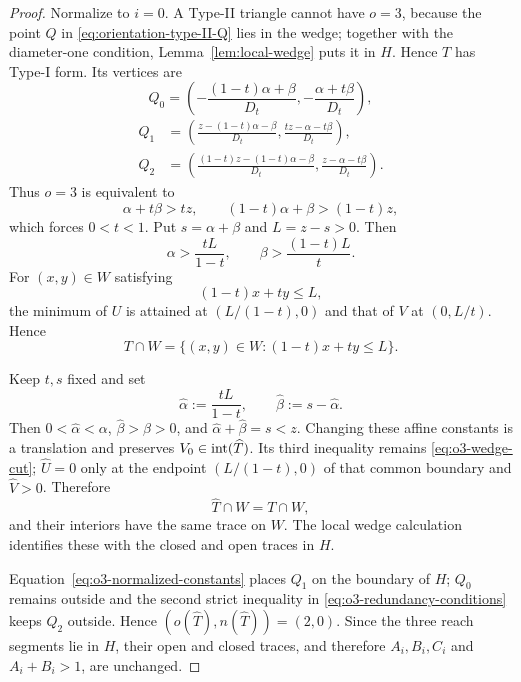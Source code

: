 \begin{proof}
Normalize to $i=0$.  A Type-II triangle cannot have $o=3$, because the point
$Q$ in \eqref{eq:orientation-type-II-Q} lies in the wedge; together with the
diameter-one condition, Lemma~\ref{lem:local-wedge} puts it in $H$.  Hence
$T$ has Type-I form.  Its vertices are
\[
 Q_0=\left(-\frac{(1-t)\alpha+\beta}{D_t},
           -\frac{\alpha+t\beta}{D_t}\right),
\]
\begin{equation}
\begin{aligned}
 Q_1&=\left(\frac{z-(1-t)\alpha-\beta}{D_t},
             \frac{tz-\alpha-t\beta}{D_t}\right),\\
 Q_2&=\left(\frac{(1-t)z-(1-t)\alpha-\beta}{D_t},
             \frac{z-\alpha-t\beta}{D_t}\right).
\end{aligned}
\label{eq:o3-type-I-vertices}
\end{equation}
Thus $o=3$ is equivalent to
\begin{equation}
 \alpha+t\beta>tz,\qquad
 (1-t)\alpha+\beta>(1-t)z,
 \label{eq:o3-outside-conditions}
\end{equation}
which forces $0<t<1$.  Put $s=\alpha+\beta$ and $L=z-s>0$.  Then
\begin{equation}
 \alpha>\frac{tL}{1-t},\qquad
 \beta>\frac{(1-t)L}{t}.
 \label{eq:o3-redundancy-conditions}
\end{equation}
For $(x,y)\in W$ satisfying
\begin{equation}
 (1-t)x+ty\le L,
 \label{eq:o3-wedge-cut}
\end{equation}
the minimum of $U$ is attained at $(L/(1-t),0)$ and that of $V$ at
$(0,L/t)$.  Hence
\begin{equation}
 T\cap W=\{(x,y)\in W:(1-t)x+ty\le L\}.
 \label{eq:o3-wedge-trace}
\end{equation}

Keep $t,s$ fixed and set
\begin{equation}
 \widehat\alpha:=\frac{tL}{1-t},\qquad
 \widehat\beta:=s-\widehat\alpha.
 \label{eq:o3-normalized-constants}
\end{equation}
Then $0<\widehat\alpha<\alpha$, $\widehat\beta>\beta>0$, and
$\widehat\alpha+\widehat\beta=s<z$.  Changing these affine constants is a
translation and preserves $V_0\in\mathrm{int}(\widehat T)$.  Its third
inequality remains \eqref{eq:o3-wedge-cut}; $\widehat U=0$ only at the
endpoint $(L/(1-t),0)$ of that common boundary and $\widehat V>0$.  Therefore
\[
 \widehat T\cap W=T\cap W,
\]
and their interiors have the same trace on $W$.  The local wedge calculation
identifies these with the closed and open traces in $H$.

Equation~\eqref{eq:o3-normalized-constants} places $Q_1$ on the boundary of
$H$; $Q_0$ remains outside and the second strict inequality in
\eqref{eq:o3-redundancy-conditions} keeps $Q_2$ outside.  Hence
$(o(\widehat T),n(\widehat T))=(2,0)$.  Since the three reach segments lie in
$H$, their open and closed traces, and therefore $A_i,B_i,C_i$ and
$A_i+B_i>1$, are unchanged.
\end{proof}

